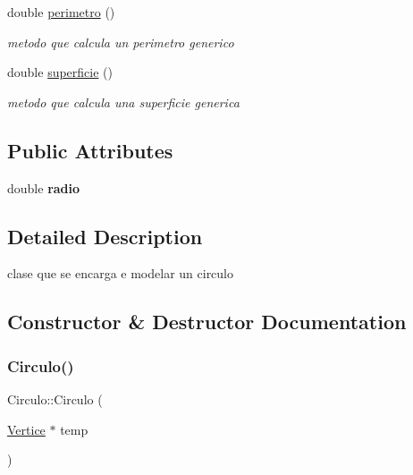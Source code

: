 \begin{DoxyCompactItemize}
double \hyperlink{class_circulo_acc35f8fdd7303fca9fe54b0da458bdf2}{perimetro} ()
\begin{DoxyCompactList}\small\item\em metodo que calcula un perimetro generico \end{DoxyCompactList}\item 
\mbox{\label{class_circulo_a12314ab6d649a9e6c1300c6950a46ce7}} 
double \hyperlink{class_circulo_a12314ab6d649a9e6c1300c6950a46ce7}{superficie} ()
\begin{DoxyCompactList}\small\item\em metodo que calcula una superficie generica \end{DoxyCompactList}\end{DoxyCompactItemize}
\subsection*{Public Attributes}
\begin{DoxyCompactItemize}
\item 
\mbox{\label{class_circulo_aba57029c5768d344c4ef536e5323122b}} 
double {\bfseries radio}
\end{DoxyCompactItemize}


\subsection{Detailed Description}
clase que se encarga e modelar un circulo 

\subsection{Constructor \& Destructor Documentation}
\mbox{\label{class_circulo_a790ee75260b927c3b54d534a5d2bab1c}} 
\subsubsection{\texorpdfstring{Circulo()}{Circulo()}}
{\footnotesize\ttfamily Circulo\+::\+Circulo (\begin{DoxyParamCaption}\item[{\hyperlink{class_vertice}{Vertice} $\ast$}]{temp }\end{DoxyParamCaption})}




